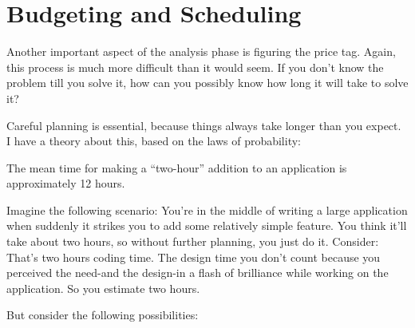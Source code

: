 \section{Budgeting and Scheduling}

\noindent Another important aspect of the analysis phase is figuring the price tag.
Again, this process is much more difficult than it would seem. If you
don't know the problem till you solve it, how can you possibly know how
long it will take to solve it?

Careful planning is essential, because things always take longer
than you expect. I have a theory about this, based on the laws of
probability:



\begin{tip}
The mean time for making a ``two-hour'' addition to an application is
approximately 12 hours.
\end{tip}

\noindent Imagine the following scenario: You're in the middle of writing a large
application when suddenly it strikes you to add some relatively simple
feature. You think it'll take about two hours, so without further
planning, you just do it. Consider: That's two hours coding time. The
design time you don't count because you perceived the need-and the
design-in a flash of brilliance while working on the application. So you
estimate two hours.

But consider the following possibilities:

